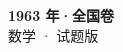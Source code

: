 \documentclass[zihao=-4, a4paper]{ctexart}
\begin{document}
\begin{center}
  {\Large\bfseries 1963 年·全国卷}\\[4pt]
  {\large 数学 · 试题版}
\end{center}
\medskip
{}

\end{document}
